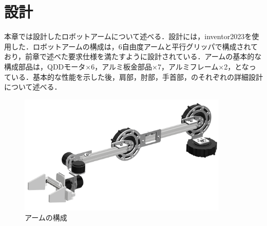 \chapter{設計}
\label{chap:third}
%
本章では設計したロボットアームについて述べる．設計には，inventor2023を使用した．ロボットアームの構成は，6自由度アームと平行グリッパで構成されており，前章で述べた要求仕様を満たすように設計されている．アームの基本的な構成部品は，QDDモータ×6，アルミ板金部品×7，アルミフレーム×2，となっている．基本的な性能を示した後，肩部，肘部，手首部，のそれぞれの詳細設計について述べる．
\begin{figure}[h]
  \centering
  \includegraphics[width=10cm]{images/arm_design.png}
  \caption{アームの構成}
  \label{fig:arm_design}
\end{figure}



%